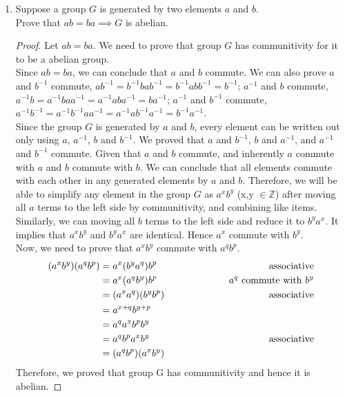 \documentclass[12pt]{article}
\newcommand{\Z}{\mathbb{Z}}
\newcommand{\tab}{\hspace{10mm}}
\begin{document}
\begin{enumerate}
    \item Suppose a group $G$ is generated by two elements $a$ and $b$.\\
        Prove that $ab = ba \implies G$ is abelian.
        \begin{proof}
			Let $ab=ba$. We need to prove that group $G$ has communitivity 
            for it to be a abelian group. \\
            Since $ab=ba$, we can conclude that $a$ and $b$ commute. We can also prove $a$ and $b^{-1}$ commute,
            $ab^{-1} = b^{-1}bab^{-1} = b^{-1}abb^{-1} = b^{-1}$; $a^{-1}$ and $b$ commute, $a^{-1}b = a^{-1}baa^{-1}
            = a^{-1}aba^{-1} = ba^{-1}$; $a^{-1}$ and $b^{-1}$ commute, $ a^{-1}b^{-1} = a^{-1}b^{-1}aa^{-1} = a^{-1}ab^{-1}a^{-1}
            =b^{-1}a^{-1}$.\\
            Since the group $G$ is generated by $a$ and $b$, every element can be written out
            only using $a$, $a^{-1}$, $b$ and $b^{-1}$. We proved that $a$ and $b^{-1}$, $b$ and $a^{-1}$,
            and $a^{-1}$ and $b^{-1}$ commute. Given that $a$ and $b$ commute, and inherently $a$ commute with $a$ and $b$ commute
            with $b$. We can conclude that all elements commute with each other in any generated elements by $a$ and $b$. Therefore, 
            we will be able to simplify any element in the group $G$ as $a^xb^y$ (x,y $\in \Z$) after moving all $a$ terms to the left side by communitivity,
            and combining like items. Similarly, we can moving all $b$ terms to the left side and reduce it to $b^ya^x$. It implies that $a^xb^y$  
            and $b^ya^x$ are identical. Hence $a^x$ commute with $b^y$.
            \\
            Now, we need to prove that $a^xb^y$ commute with $a^qb^p$.\\
             \begin{align*}
                (a^xb^y)(a^qb^p) &= a^x(b^ya^q)b^p  \tab \tab &\text{associative}\\
                &= a^x(a^qb^y)b^p  \tab \tab &\text{$a^q$ commute with $b^y$}\\
                &= (a^xa^q)(b^yb^p) \tab \tab &\text{associative}\\
                &= a^{x+q}b^{y+p}\\
                & = a^qa^xb^pb^y\\
                & = a^qb^pa^xb^y \tab \tab &\text{associative} \\
                & = (a^qb^p)(a^xb^y) 
                \\
             \end{align*}
            Therefore, we proved that group G has communitivity and hence it is abelian.
        \end{proof}


\end{enumerate}
\end{document}
